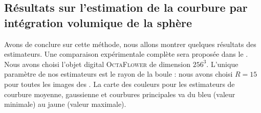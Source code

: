 \subsection{Résultats sur l'estimation de la courbure par intégration volumique de la sphère}
%
Avons de conclure sur cette méthode, nous allons montrer quelques résultats des
estimateurs. Une comparaison expérimentale complète sera proposée dans le
.
%
\\
%
Nous avons choisi l'objet digital \textsc{OctaFlower} de dimension $256^3$.
L'unique paramètre de nos estimateurs est le rayon de la boule : nous avons
choisi $R=15$ pour toutes les images des
. La carte des couleurs
pour les estimateurs de courbure moyenne, gaussienne et courbures principales va
du bleu (valeur minimale) au jaune (valeur maximale).
%
